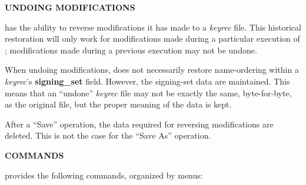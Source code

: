 {\bf UNDOING MODIFICATIONS}

 has the ability to reverse modifications it has made to a
{\it keyrec} file.  This historical restoration will only work for
modifications made during a particular execution of ;
modifications made during a previous execution may not be undone.

When undoing modifications,  does not necessarily restore
name-ordering within a {\it keyrec}'s {\bf signing\_set} field.  However, the
signing-set data are maintained.  This means that an ``undone'' {\it keyrec}
file may not be exactly the same, byte-for-byte, as the original file, but the
proper meaning of the data is kept.

After a ``Save'' operation, the data required for reversing modifications are
deleted.  This is not the case for the ``Save As'' operation.

\clearpage

{\bf COMMANDS}

 provides the following commands, organized by menus:

